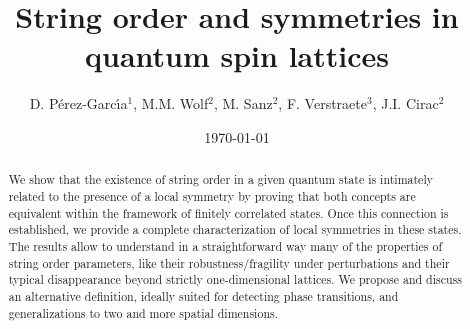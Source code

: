 \documentclass[prl,floatfix,showpacs,amsmat,twocolumn]{revtex4}
\newcommand{\1}{\mathbbm{1}}
\renewcommand{\>}{\rangle}
\newcommand{\<}{\langle}
\begin{document}
\title{String order and symmetries in quantum spin lattices}

\author{D. P\'{e}rez-Garc\'{\i}a$^1$, M.M. Wolf$^2$, M. Sanz$^2$, F. Verstraete$^3$, J.I. Cirac$^2$}

\date{\today}


\begin{abstract}
    We show that the existence of string order in a given quantum
    state is intimately related to the presence of a local symmetry by
    proving that both concepts are equivalent within the framework of
    finitely correlated states. Once this connection is established,
    we provide a complete characterization of local symmetries in
    these states. The results allow to understand in a straightforward
    way many of the properties of string order parameters, like their
    robustness/fragility under perturbations and their typical
    disappearance beyond strictly one-dimensional lattices. We propose
    and discuss an alternative definition, ideally suited for
    detecting phase transitions, and generalizations to two and more
    spatial dimensions.
\end{abstract}

\maketitle

\end{document}
